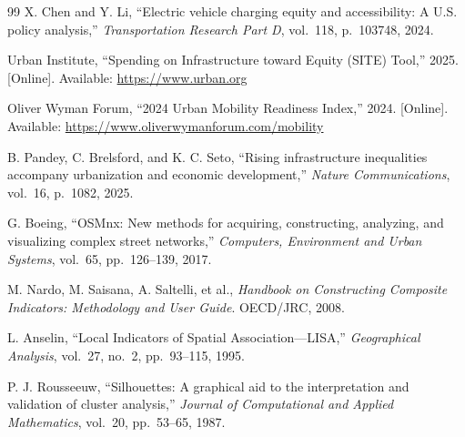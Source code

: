 \documentclass[11pt]{article}
\begin{document}
\begin{thebibliography}{99}
 X. Chen and Y. Li, ``Electric vehicle charging equity and accessibility: A U.S. policy analysis,'' \textit{Transportation Research Part D}, vol.~118, p.~103748, 2024.

 Urban Institute, ``Spending on Infrastructure toward Equity (SITE) Tool,'' 2025. [Online]. Available: \url{https://www.urban.org}

 Oliver Wyman Forum, ``2024 Urban Mobility Readiness Index,'' 2024. [Online]. Available: \url{https://www.oliverwymanforum.com/mobility}

 B. Pandey, C. Brelsford, and K. C. Seto, ``Rising infrastructure inequalities accompany urbanization and economic development,'' \textit{Nature Communications}, vol.~16, p.~1082, 2025.

 G. Boeing, ``OSMnx: New methods for acquiring, constructing, analyzing, and visualizing complex street networks,'' \textit{Computers, Environment and Urban Systems}, vol.~65, pp.~126--139, 2017.

 M. Nardo, M. Saisana, A. Saltelli, et al., \textit{Handbook on Constructing Composite Indicators: Methodology and User Guide}. OECD/JRC, 2008.

 L. Anselin, ``Local Indicators of Spatial Association---LISA,'' \textit{Geographical Analysis}, vol.~27, no.~2, pp.~93--115, 1995.

 P. J. Rousseeuw, ``Silhouettes: A graphical aid to the interpretation and validation of cluster analysis,'' \textit{Journal of Computational and Applied Mathematics}, vol.~20, pp.~53--65, 1987.

\end{thebibliography}
\end{document}
